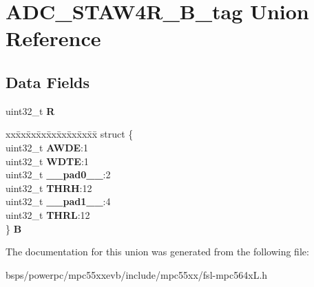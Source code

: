 \hypertarget{unionADC__STAW4R__32B__tag}{}\section{A\+D\+C\+\_\+\+S\+T\+A\+W4\+R\+\_\+B\+\_\+tag Union Reference}
\label{unionADC__STAW4R__32B__tag}
\subsection*{Data Fields}
\begin{DoxyCompactItemize}
\item 
\mbox{\label{unionADC__STAW4R__32B__tag_a3ebe8303af06f2dcaf087a0f35fee1f6}} 
uint32\+\_\+t {\bfseries R}
\item 
\mbox{\label{unionADC__STAW4R__32B__tag_a3ad226550aa155d3c7d5a40776d26924}} 
\begin{tabbing}
xx\=xx\=xx\=xx\=xx\=xx\=xx\=xx\=xx\=\kill
struct \{\\
\>uint32\_t {\bfseries AWDE}:1\\
\>uint32\_t {\bfseries WDTE}:1\\
\>uint32\_t {\bfseries \_\_pad0\_\_}:2\\
\>uint32\_t {\bfseries THRH}:12\\
\>uint32\_t {\bfseries \_\_pad1\_\_}:4\\
\>uint32\_t {\bfseries THRL}:12\\
\} {\bfseries B}\\

\end{tabbing}\end{DoxyCompactItemize}


The documentation for this union was generated from the following file\+:\begin{DoxyCompactItemize}
\item 
bsps/powerpc/mpc55xxevb/include/mpc55xx/fsl-\/mpc564x\+L.\+h\end{DoxyCompactItemize}
